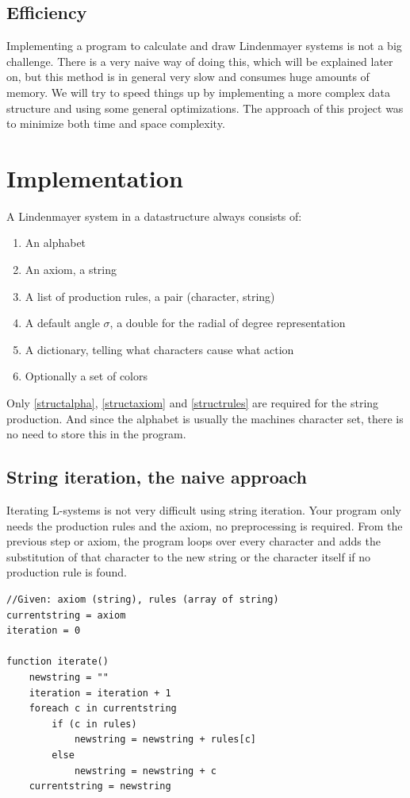 \documentclass[11pt,a4paper]{article}
\begin{document}
\subsection{Efficiency} %
Implementing a program to calculate and draw Lindenmayer systems is not a big challenge. There is a very naive way of doing this, which will be explained later on, but this method is in general very slow and consumes huge amounts of memory. We will try to speed things up by implementing a more complex data structure and using some general optimizations. The approach of this project was to minimize both time and space complexity.

\newpage
\section{Implementation}

A Lindenmayer system in a datastructure always consists of:
\begin{enumerate}
\item An alphabet \label{structalpha}
\item An axiom, a string \label{structaxiom}
\item A list of production rules, a pair (character, string) \label{structrules}
\item A default angle $\sigma$, a double for the radial of degree representation
\item A dictionary, telling what characters cause what action
\item Optionally a set of colors
\end{enumerate}
Only \ref{structalpha}, \ref{structaxiom} and \ref{structrules} are required for the string production. And since the alphabet is usually the machines character set, there is no need to store this in the program.

\subsection{String iteration, the naive approach}

Iterating L-systems is not very difficult using string iteration. Your program only needs the production rules and the axiom, no preprocessing is required. From the previous step or axiom, the program loops over every character and adds the substitution of that character to the new string or the character itself if no production rule is found.

\lstset{label=code:stringit,caption=String iteration}
\begin{lstlisting}
//Given: axiom (string), rules (array of string)
currentstring = axiom
iteration = 0

function iterate()
	newstring = ""
	iteration = iteration + 1
	foreach c in currentstring
		if (c in rules)
			newstring = newstring + rules[c]
		else
			newstring = newstring + c
	currentstring = newstring
\end{lstlisting}
\end{document}
